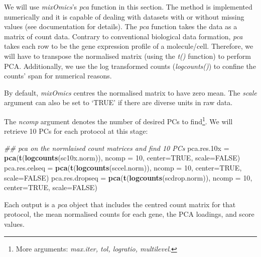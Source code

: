 \documentclass[]{book}
\newenvironment{Shaded}{\begin{snugshade}}{\end{snugshade}}
\newcommand{\CommentTok}[1]{\textcolor[rgb]{0.56,0.35,0.01}{\textit{#1}}}
\newcommand{\DataTypeTok}[1]{\textcolor[rgb]{0.13,0.29,0.53}{#1}}
\newcommand{\DecValTok}[1]{\textcolor[rgb]{0.00,0.00,0.81}{#1}}
\newcommand{\FloatTok}[1]{\textcolor[rgb]{0.00,0.00,0.81}{#1}}
\newcommand{\KeywordTok}[1]{\textcolor[rgb]{0.13,0.29,0.53}{\textbf{#1}}}
\newcommand{\NormalTok}[1]{#1}
\newcommand{\OtherTok}[1]{\textcolor[rgb]{0.56,0.35,0.01}{#1}}
\newcommand{\StringTok}[1]{\textcolor[rgb]{0.31,0.60,0.02}{#1}}
\let\rmarkdownfootnote\footnote%
\def\footnote{\protect\rmarkdownfootnote}
\theoremstyle{definition}
\theoremstyle{definition}
\theoremstyle{definition}
\theoremstyle{remark}
\begin{document}
We will use \emph{mixOmics}'s \emph{pca} function in this section. The
method is implemented numerically and it is capable of dealing with
datasets with or without missing values (see documentation for details).
The \emph{pca} function takes the data as a matrix of count data.
Contrary to conventional biological data formation, \emph{pca} takes
each row to be the gene expression profile of a molecule/cell.
Therefore, we will have to transpose the normalised matrix (using the
\emph{t()} function) to perform PCA. Additionally, we use the log
transformed counts (\emph{logcounts()}) to confine the counts' span for
numerical reasons.

By default, \emph{mixOmics} centres the normalised matrix to have zero
mean. The \emph{scale} argument can also be set to `TRUE' if there are
diverse units in raw data.

The \emph{ncomp} argument denotes the number of desired PCs to
find\footnote{More arguments: \emph{max.iter, tol, logratio,
  multilevel}.}. We will retrieve 10 PCs for each protocol at this
stage:

\begin{Shaded}
\begin{Highlighting}[]
\CommentTok{## pca on the normlaised count matrices and find 10 PCs}
\NormalTok{pca.res}\FloatTok{.10}\NormalTok{x =}\StringTok{     }\KeywordTok{pca}\NormalTok{(}\KeywordTok{t}\NormalTok{(}\KeywordTok{logcounts}\NormalTok{(sc10x.norm)),  }\DataTypeTok{ncomp =} \DecValTok{10}\NormalTok{,}
                      \DataTypeTok{center=}\OtherTok{TRUE}\NormalTok{, }\DataTypeTok{scale=}\OtherTok{FALSE}\NormalTok{)}
\NormalTok{pca.res.celseq =}\StringTok{  }\KeywordTok{pca}\NormalTok{(}\KeywordTok{t}\NormalTok{(}\KeywordTok{logcounts}\NormalTok{(sccel.norm)),  }\DataTypeTok{ncomp =} \DecValTok{10}\NormalTok{,}
                      \DataTypeTok{center=}\OtherTok{TRUE}\NormalTok{, }\DataTypeTok{scale=}\OtherTok{FALSE}\NormalTok{)}
\NormalTok{pca.res.dropseq =}\StringTok{ }\KeywordTok{pca}\NormalTok{(}\KeywordTok{t}\NormalTok{(}\KeywordTok{logcounts}\NormalTok{(scdrop.norm)), }\DataTypeTok{ncomp =} \DecValTok{10}\NormalTok{,}
                      \DataTypeTok{center=}\OtherTok{TRUE}\NormalTok{, }\DataTypeTok{scale=}\OtherTok{FALSE}\NormalTok{)}
\end{Highlighting}
\end{Shaded}

Each output is a \emph{pca} object that includes the centred count
matrix for that protocol, the mean normalised counts for each gene, the
PCA loadings, and score values.
\end{document}
